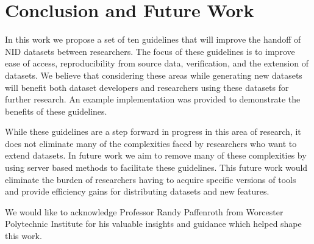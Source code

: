 \documentclass[sigconf, anonymous, screen]{acmart}
\begin{document}
\section{Conclusion and Future Work}\label{sec:conclusion}
In this work we propose a set of ten guidelines that will improve the handoff of NID datasets between researchers.
The focus of these guidelines is to improve ease of access, reproducibility from source data, verification, and the extension of datasets.
We believe that considering these areas while generating new datasets will benefit both dataset developers and researchers using these datasets for further research.
An example implementation was provided to demonstrate the benefits of these guidelines.

While these guidelines are a step forward in progress in this area of research, it does not eliminate many of the complexities faced by researchers who want to extend datasets.
In future work we aim to remove many of these complexities by using server based methods to facilitate these guidelines.
This future work would eliminate the burden of researchers having to acquire specific versions of tools and provide efficiency gains for distributing datasets and new features.

\begin{acks}
    We would like to acknowledge Professor Randy Paffenroth from Worcester Polytechnic Institute for his valuable insights and guidance which helped shape this work.
\end{acks}




\appendix
\end{document}
